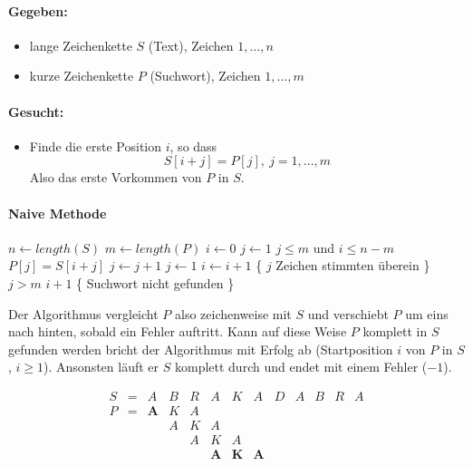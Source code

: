 \documentclass[a4paper,twoside,DIV15,BCOR12mm]{scrbook}
\begin{document}
\paragraph{Gegeben:}
\begin{itemize}
	\item lange Zeichenkette $S$ (Text), Zeichen $1,\ldots,n$
	\item kurze Zeichenkette $P$ (Suchwort), Zeichen $1,\ldots,m$
\end{itemize}
\paragraph{Gesucht:}
\begin{itemize}
	\item Finde die erste Position $i$, so dass
		$$S[i+j] = P[j],\ j=1,\ldots,m$$
		Also das erste Vorkommen von $P$ in $S$.
\end{itemize}

\paragraph{Naive Methode}

\begin{codebox}
\li $n \gets length(S)$
\li $m \gets length(P)$
\li $i \gets 0$
\li	$j \gets 1$
\li	\While $j \leq m$ und $i \leq n-m$
\li	\Do \If $P[j]=S[i+j]$
\li			\Then $j \gets j+1$
\li			\Else $j \gets 1$
\li						$i \gets i + 1$
				\End
		\End
\zi \{ $j$ Zeichen stimmten überein \}
\li	\If $j > m$
\li			\Then \Return $i + 1$
		\End
\zi \{ Suchwort nicht gefunden \}
\li	{}
\end{codebox}

Der Algorithmus vergleicht $P$ also zeichenweise mit $S$ und verschiebt $P$ um eins nach hinten, sobald ein Fehler auftritt.
Kann auf diese Weise $P$ komplett in $S$ gefunden werden bricht der Algorithmus mit Erfolg ab (Startposition $i$ von $P$ in $S$,
$i \geq 1$). Ansonsten läuft er $S$ komplett durch und endet mit einem Fehler ($-1$).

$$\begin{array}{ccccccccccccc}
	S & = & A & B & R & A & K & A & D & A & B & R & A \\
  P & = & \textbf{A} & K & A \\
	  &   &   & A & K & A \\
	  &   &	  &   & A & K & A \\
	  &	  &   &	  &   & \textbf{A} & \textbf{K} & \textbf{A} \\
\end{array}$$
\end{document}
